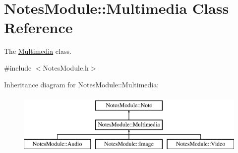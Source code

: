 \hypertarget{class_notes_module_1_1_multimedia}{\section{Notes\-Module\-:\-:Multimedia Class Reference}
\label{class_notes_module_1_1_multimedia}
}


The \hyperlink{class_notes_module_1_1_multimedia}{Multimedia} class.  




{\ttfamily \#include $<$Notes\-Module.\-h$>$}

Inheritance diagram for Notes\-Module\-:\-:Multimedia\-:\begin{figure}[H]
\begin{center}
\leavevmode
\includegraphics[height=3.000000cm]{class_notes_module_1_1_multimedia}
\end{center}
\end{figure}
